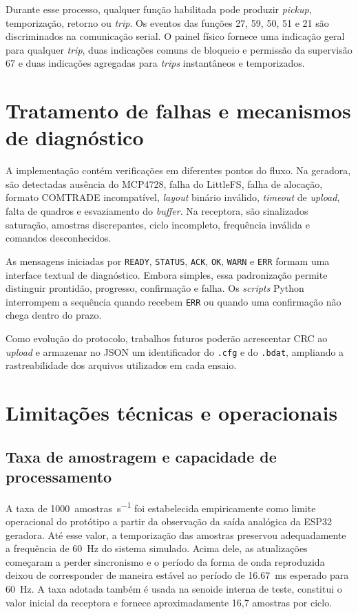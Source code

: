 Durante esse processo, qualquer função habilitada pode produzir \textit{pickup}, temporização, retorno ou \textit{trip}. Os eventos das funções 27, 59, 50, 51 e 21 são discriminados na comunicação serial. O painel físico fornece uma indicação geral para qualquer \textit{trip}, duas indicações comuns de bloqueio e permissão da supervisão 67 e duas indicações agregadas para \textit{trips} instantâneos e temporizados.

\section{Tratamento de falhas e mecanismos de diagnóstico}

A implementação contém verificações em diferentes pontos do fluxo. Na geradora, são detectadas ausência do MCP4728, falha do LittleFS, falha de alocação, formato COMTRADE incompatível, \textit{layout} binário inválido, \textit{timeout} de \textit{upload}, falta de quadros e esvaziamento do \textit{buffer}. Na receptora, são sinalizados saturação, amostras discrepantes, ciclo incompleto, frequência inválida e comandos desconhecidos.

As mensagens iniciadas por \texttt{READY}, \texttt{STATUS}, \texttt{ACK}, \texttt{OK}, \texttt{WARN} e \texttt{ERR} formam uma interface textual de diagnóstico. Embora simples, essa padronização permite distinguir prontidão, progresso, confirmação e falha. Os \textit{scripts} Python interrompem a sequência quando recebem \texttt{ERR} ou quando uma confirmação não chega dentro do prazo.

Como evolução do protocolo, trabalhos futuros poderão acrescentar CRC ao \textit{upload} e armazenar no JSON um identificador do \texttt{.cfg} e do \texttt{.bdat}, ampliando a rastreabilidade dos arquivos utilizados em cada ensaio.

\section{Limitações técnicas e operacionais}
\label{sec:limitacoes-tecnicas}

\subsection{Taxa de amostragem e capacidade de processamento}

A taxa de \SI{1000}{amostras\per\second} foi estabelecida empiricamente como limite operacional do protótipo a partir da observação da saída analógica da ESP32 geradora. Até esse valor, a temporização das amostras preservou adequadamente a frequência de \SI{60}{\hertz} do sistema simulado. Acima dele, as atualizações começaram a perder sincronismo e o período da forma de onda reproduzida deixou de corresponder de maneira estável ao período de \SI{16,67}{\milli\second} esperado para \SI{60}{\hertz}. A taxa adotada também é usada na senoide interna de teste, constitui o valor inicial da receptora e fornece aproximadamente 16,7 amostras por ciclo.

